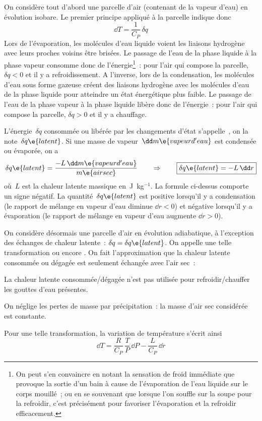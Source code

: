 \sk
On considère tout d'abord une parcelle d'air (contenant de la vapeur d'eau) en évolution isobare. Le premier principe appliqué à la parcelle indique donc
\[ \dd T = \frac{1}{C_P} \, \delta q \]
Lors de l'évaporation, les molécules d'eau liquide voient les liaisons hydrogène avec leurs proches voisins être brisées. Le passage de l'eau de la phase liquide à la phase vapeur consomme donc de l'énergie\footnote{On peut s'en convaincre en notant la sensation de froid immédiate que provoque la sortie d'un bain à cause de l'évaporation de l'eau liquide sur le corps mouillé~; ou en se souvenant que lorsque l'on souffle sur la soupe pour la refroidir, c'est précisément pour favoriser l'évaporation et la refroidir efficacement.}~: pour l'air qui compose la parcelle, $\delta q < 0$ et il y a refroidissement. 
A l'inverse, lors de la condensation, les molécules d'eau sous forme gazeuse créent des liaisons hydrogène avec les molécules d'eau de la phase liquide pour atteindre un état énergétique plus faible. Le passage de l'eau de la phase vapeur à la phase liquide libère donc de l'énergie~: pour l'air qui compose la parcelle, $\delta q > 0$ et il y a chauffage.

\sk
L'énergie~$\delta q$ consommée ou libérée par les changements d'état s'appelle~, on la note~$\delta q\e{latent}$. Si une masse de vapeur~$\dd m\e{vapeur d'eau}$ est condensée ou évaporée, on a
\[ \delta q\e{latent} = \frac{- L \, \dd m\e{vapeur d'eau}}{m\e{air sec}} \qquad \Rightarrow \qquad \boxed{ \delta q\e{latent} = - L \, \dd r } \]
où~$L$ est la chaleur latente massique en~J~kg$^{-1}$. La formule ci-dessus comporte un signe négatif. La quantité~$\delta q\e{latent}$ est positive lorsqu'il y a condensation (le rapport de mélange en vapeur d'eau diminue $\dd r < 0$) et négative lorsqu'il y a évaporation (le rapport de mélange en vapeur d'eau augmente $\dd r > 0$).

\sk
On considère désormais une parcelle d'air en évolution adiabatique, à l'exception des échanges de chaleur latente~: $\delta q = \delta q\e{latent}$. On appelle une telle transformation  ou encore . On fait l'approximation que la chaleur latente consommée ou dégagée est seulement échangée avec l'air sec~:
\begin{citemize}
\item La chaleur latente consommée/dégagée n'est pas utilisée pour refroidir/chauffer les gouttes d'eau présentes.
\item On néglige les pertes de masse par précipitation~: la masse d'air sec considérée est constante.
\end{citemize}
Pour une telle transformation, la variation de température s'écrit ainsi
\[ \dd T = \frac{R}{C_P} \, \frac{T}{P} \, \dd P - \frac{L}{C_P} \, \dd r \]
